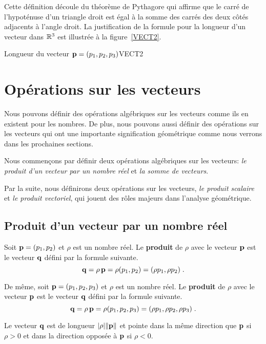 {Cette définition découle du théorème de Pythagore qui affirme que le
carré de l'hypoténuse d'un triangle droit est égal à la somme des
carrés des deux côtés adjacents à l'angle droit. La justification de
la formule pour la longueur d'un vecteur dans $\mathbb{R}^3$ est illustrée à la
figure~\ref{VECT2}.

{Longueur du vecteur $\mathbf{p}=(p_1,p_2,p_3)$}{VECT2}

\section{Opérations sur les vecteurs}

Nous pouvons définir des opérations algébriques sur les vecteurs comme ils
en existent pour les nombres.  De plus, nous pouvons aussi définir des
opérations sur les vecteurs qui ont une importante signification
géométrique comme nous verrons dans les prochaines sections.

Nous commençons par définir deux opérations algébriques sur les vecteurs:
{\em le produit d'un vecteur par un nombre réel} et
{\em la somme de vecteurs}.

Par la suite, nous définirons deux opérations sur les vecteurs,
{\em le produit scalaire} et {\em le produit vectoriel}, qui jouent
des rôles majeurs dans l'analyse géométrique.

\subsection{Produit d'un vecteur par un nombre réel}

\begin{defn} 
Soit $\mathbf{p} = (p_1,p_2)$ et $\rho$ est un nombre réel.  Le
{\bfseries produit} de $\rho$ avec le vecteur $\mathbf{p}$ est le
vecteur $\mathbf{q}$ défini par la formule suivante.
\[
\mathbf{q} = \rho\, \mathbf{p} = \rho (p_1, p_2) = (\rho p_1 , \rho p_2) \; .
\]

De même, soit $\mathbf{p} = (p_1,p_2,p_3)$ et $\rho$ est un nombre réel.
Le {\bfseries produit} de $\rho$ avec le vecteur $\mathbf{p}$ est le vecteur
$\mathbf{q}$ défini par la formule suivante.
\[
\mathbf{q} = \rho\, \mathbf{p} = \rho (p_1,p_2,p_3)
= (\rho p_1 , \rho p_2, \rho p_3) \; .
\]
\end{defn}

Le vecteur $\mathbf{q}$ est de longueur $|\rho| \|\mathbf{p}\|$ et pointe dans la
même direction que $\mathbf{p}$ si $\rho > 0$ et dans la direction opposée à
$\mathbf{p}$ si $\rho < 0$.

}
